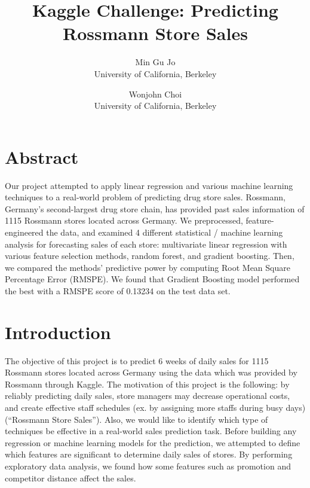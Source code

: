 \documentclass[letterpaper,twocolumn,11pt]{article}
\begin{document}
\date{}

\title{\Large \bf Kaggle Challenge: Predicting Rossmann Store Sales}

\author{
  {\rm Min Gu Jo}\\
  University of California, Berkeley
  \and
      {\rm Wonjohn Choi}\\
      University of California, Berkeley
} %

\maketitle

\thispagestyle{empty}


\section{Abstract}
Our project attempted to apply linear regression and various machine learning techniques to a real-world problem of predicting drug store sales. Rossmann, Germany's second-largest drug store chain, has provided past sales information of 1115 Rossmann stores located across Germany. We preprocessed, feature-engineered the data, and examined 4 different statistical / machine learning analysis for forecasting sales of each store: multivariate linear regression with various feature selection methods, random forest, and gradient boosting. Then, we compared the methods' predictive power by computing Root Mean Square Percentage Error (RMSPE). We found that Gradient Boosting model performed the best with a RMSPE score of 0.13234 on the test data set.

\section{Introduction}
The objective of this project is to predict 6 weeks of daily sales for 1115 Rossmann stores located across Germany using the data which was provided by Rossmann through Kaggle. The motivation of this project is the following: by reliably predicting daily sales, store managers may decrease operational costs, and create effective staff schedules (ex. by assigning more staffs during busy days) (``Rossmann Store Sales''). Also, we would like to identify which type of techniques be effective in a real-world sales prediction task. Before building any regression or machine learning models for the prediction, we attempted to define which features are significant to determine daily sales of stores. By performing exploratory data analysis, we found how some features such as promotion and competitor distance affect the sales. %
\end{document}
